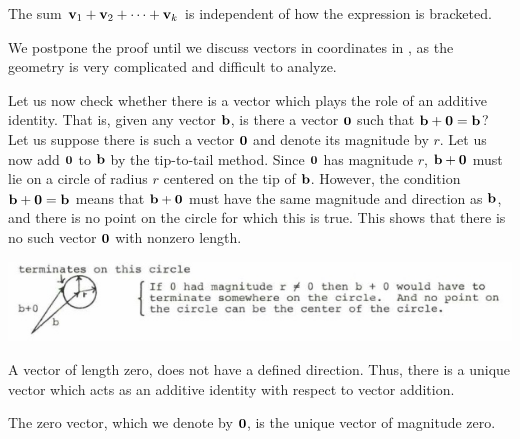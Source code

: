 \documentclass[12pt,letterpaper,reqno]{article}
\numberwithin{equation}{section}
\newcommand{\fixme}[1]{{\color{orange}{[#1]}}}
\begin{document}
\begin{cor}
The sum ${\bf v}_1+{\bf v}_2+\cdots + {\bf v}_k$ is independent of how the expression is bracketed.	
\end{cor}

\begin{pf}
We postpone the proof until we discuss vectors in coordinates in \fixme{Insert section reference here.}, as the geometry is very complicated and difficult to analyze.	
\end{pf}

Let us now check whether there is a vector which plays the role of an additive identity. That is, given any vector ${\bf b}$, is there a vector ${\bf 0}$ such that ${\bf b}+{\bf 0}={\bf b}$? Let us suppose there is such a vector ${\bf 0}$ and denote its magnitude by $r$. Let us now add ${\bf 0}$ to ${\bf b}$ by the tip-to-tail method. Since ${\bf 0}$ has magnitude $r$, ${\bf b}+{\bf 0}$ must lie on a circle of radius $r$ centered on the tip of ${\bf b}$. However, the condition ${\bf b}+{\bf 0}={\bf b}$ means that ${\bf b}+{\bf 0}$ must have the same magnitude and direction as ${\bf b}$, and there is no point on the circle for which this is true. This shows that there is no such vector ${\bf 0}$ with nonzero length. 
\begin{center}
	\includegraphics[scale=0.5]{figures_mvc/b_plus_zero_circle}
\end{center}

A vector of length zero, does not have a defined direction. Thus, there is a unique vector which acts as an additive identity with respect to vector addition.

\begin{defn}
	The zero vector, which we denote by ${\bf 0}$, is the unique vector of magnitude zero.
\end{defn}
\end{document}
